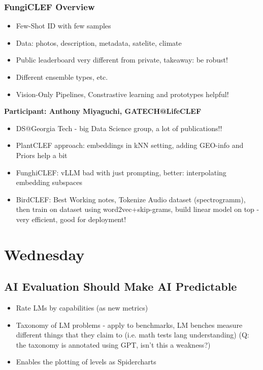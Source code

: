 \documentclass[a4paper]{article}
\begin{document}
\subsubsection{FungiCLEF Overview}
\begin{itemize}
    \item Few-Shot ID with few samples
    \item Data: photos, description, metadata, satelite, climate
    \item Public leaderboard very different from private, takeaway: be robust!
    \item Different ensemble types, etc.
    \item Vision-Only Pipelines, Constrastive learning and prototypes helpful!
\end{itemize}
\textbf{Participant: Anthony Miyaguchi, GATECH@LifeCLEF}
\begin{itemize}
    \item DS@Georgia Tech - big Data Science group, a lot of publications!!
    \item PlantCLEF approach: embeddings in kNN setting, adding GEO-info and Priors help a bit
    \item FunghiCLEF: vLLM bad with just prompting, better: interpolating embedding subspaces
    \item BirdCLEF: Best Working notes, Tokenize Audio dataset (spectrogramm), then train on dataset using word2vec+skip-grams, build linear model on top - very efficient, good for deployment!
\end{itemize}
\section{Wednesday}
\subsection{AI Evaluation Should Make AI Predictable}
\begin{itemize}
    \item Rate LMs by capabilities (as new metrics)
    \item Taxonomy of LM problems - apply to benchmarks, LM benches measure different things that they claim to (i.e. math tests lang understanding) (Q: the taxonomy is annotated using GPT, isn't this a weakness?)
    \item Enables the plotting of levels as Spidercharts
\end{itemize}
\end{document}
